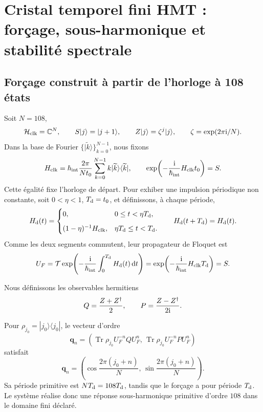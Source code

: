 \section{Cristal temporel fini HMT : forçage, sous-harmonique et stabilité spectrale}
\label{sec:hmtf2-cristal-temporal}

\subsection{Forçage construit à partir de l’horloge à 108 états}

Soit \(N=108\),
\[
 \mathcal H_{\rm clk}=\mathbb C^N,\qquad
 S|j\rangle=|j+1\rangle,\qquad
 Z|j\rangle=\zeta^j|j\rangle,\qquad
 \zeta=\exp(2\pi{\rm i}/N).
\]
Dans la base de Fourier \(\{|\widetilde k\rangle\}_{k=0}^{N-1}\), nous fixons
\[
 H_{\rm clk}
 =\hbar_{\rm int}\frac{2\pi}{Nt_0}
 \sum_{k=0}^{N-1}k|\widetilde k\rangle\langle\widetilde k|,
 \qquad
 \exp\!\left(-\frac{{\rm i}}{\hbar_{\rm int}}H_{\rm clk}t_0\right)=S.
\]
Cette égalité fixe l’horloge de départ. Pour exhiber une impulsion périodique non
constante, soit \(0<\eta<1\), \(T_{\rm d}=t_0\), et
définissons, à chaque période,
\[
 H_{\rm d}(t)=
 \begin{cases}
  0,&0\leq t<\eta T_{\rm d},\\[2mm]
  (1-\eta)^{-1}H_{\rm clk},
  &\eta T_{\rm d}\leq t<T_{\rm d}.
 \end{cases}
 \qquad H_{\rm d}(t+T_{\rm d})=H_{\rm d}(t).
\]
Comme les deux segments commutent, leur propagateur de Floquet est
\[
 U_F
 =\mathcal T\exp\!\left(
 -\frac{{\rm i}}{\hbar_{\rm int}}\int_0^{T_{\rm d}}H_{\rm d}(t)\,\mathrm dt
 \right)
 =\exp\!\left(-\frac{{\rm i}}{\hbar_{\rm int}}H_{\rm clk}T_{\rm d}\right)
 =S.
\]

Nous définissons les observables hermitiens
\[
 Q=\frac{Z+Z^\dagger}{2},
 \qquad
 P=\frac{Z-Z^\dagger}{2{\rm i}}.
\]

\begin{theorem}
\label{thm:hmtf2-subarmonia-108}
Pour \(\rho_{j_0}=|j_0\rangle\langle j_0|\), le vecteur d’ordre
\[
 \mathbf q_n
 =\left(
 \operatorname{Tr}\rho_{j_0}U_F^{-n}QU_F^n,\,
 \operatorname{Tr}\rho_{j_0}U_F^{-n}PU_F^n
 \right)
\]
satisfait
\[
 \mathbf q_n
 =\left(
 \cos\frac{2\pi(j_0+n)}N,\,
 \sin\frac{2\pi(j_0+n)}N
 \right).
\]
Sa période primitive est \(N T_{\rm d}=108T_{\rm d}\), tandis que le forçage
a pour période \(T_{\rm d}\). Le système réalise donc une réponse
sous-harmonique primitive d’ordre \(108\) dans le domaine fini déclaré.
\end{theorem}

